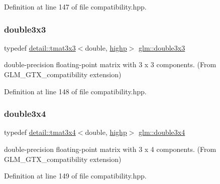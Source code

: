 Definition at line 147 of file compatibility.\+hpp.

\mbox{\label{group__gtx__compatibility_ga2b56fa7536ae728c64fde99d6618139a}} 
\subsubsection{\texorpdfstring{double3x3}{double3x3}}
{\footnotesize\ttfamily typedef \hyperlink{structglm_1_1detail_1_1tmat3x3}{detail\+::tmat3x3}$<$double, \hyperlink{namespaceglm_a0f04f086094c747d227af4425893f545ac6f7eab42eacbb10d59a58e95e362074}{highp}$>$ \hyperlink{group__gtx__compatibility_ga2b56fa7536ae728c64fde99d6618139a}{glm\+::double3x3}}



double-\/precision floating-\/point matrix with 3 x 3 components. (From G\+L\+M\+\_\+\+G\+T\+X\+\_\+compatibility extension) 



Definition at line 148 of file compatibility.\+hpp.

\mbox{\label{group__gtx__compatibility_gab38107892c0116610e7de83126aff405}} 
\subsubsection{\texorpdfstring{double3x4}{double3x4}}
{\footnotesize\ttfamily typedef \hyperlink{structglm_1_1detail_1_1tmat3x4}{detail\+::tmat3x4}$<$double, \hyperlink{namespaceglm_a0f04f086094c747d227af4425893f545ac6f7eab42eacbb10d59a58e95e362074}{highp}$>$ \hyperlink{group__gtx__compatibility_gab38107892c0116610e7de83126aff405}{glm\+::double3x4}}



double-\/precision floating-\/point matrix with 3 x 4 components. (From G\+L\+M\+\_\+\+G\+T\+X\+\_\+compatibility extension) 



Definition at line 149 of file compatibility.\+hpp.

